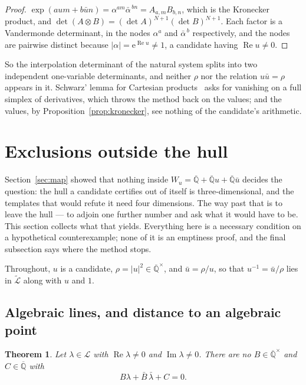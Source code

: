 \documentclass[11pt,a4paper]{article}
\theoremstyle{plain}
\newtheorem{theorem}{Theorem}[section]
\theoremstyle{definition}
\newcommand{\e}{\mathrm{e}}
\newcommand{\Alg}{\overline{\mathbb{Q}}}
\newcommand{\Logs}{\mathcal{L}}
\newcommand{\aLogs}{\widetilde{\mathcal{L}}}
\begin{document}
\begin{proof}
$\exp(aum+b\bar un)=\alpha^{am}\bar\alpha^{\,bn}=A_{a,m}B_{b,n}$, which is the Kronecker product,
and $\det(A\otimes B)=(\det A)^{N+1}(\det B)^{N+1}$. Each factor is a Vandermonde determinant, in
the nodes $\alpha^{a}$ and $\bar\alpha^{\,b}$ respectively, and the nodes are pairwise distinct
because $|\alpha|=\e^{\operatorname{Re}u}\neq1$, a candidate having $\operatorname{Re}u\neq0$.
\end{proof}

So the interpolation determinant of the natural system splits into two independent one-variable
determinants, and neither $\rho$ nor the relation $u\bar u=\rho$ appears in it. Schwarz' lemma for
Cartesian products~\cite[Proposition~4.7]{waldschmidt-book} asks for vanishing on a full simplex
of derivatives, which throws the method back on the values; and the values, by
Proposition~\ref{prop:kronecker}, see nothing of the candidate's arithmetic.

\section{Exclusions outside the hull}\label{sec:outside}

Section~\ref{sec:map} showed that nothing inside $W_{u}=\Alg+\Alg u+\Alg\bar u$ decides the
question: the hull a candidate certifies out of itself is three-dimensional, and the templates
that would refute it need four dimensions. The way past that is to leave the hull --- to adjoin
one further number and ask what it would have to be. This section collects what that yields.
Everything here is a necessary condition on a hypothetical counterexample; none of it is an
emptiness proof, and the final subsection says where the method stops.

Throughout, $u$ is a candidate, $\rho=|u|^{2}\in\Alg^{\times}$, and $\bar u=\rho/u$, so that
$u^{-1}=\bar u/\rho$ lies in $\aLogs$ along with $u$ and $1$.

\subsection*{Algebraic lines, and distance to an algebraic point}

\begin{theorem}\label{thm:line}
Let $\lambda\in\Logs$ with $\operatorname{Re}\lambda\neq0$ and $\operatorname{Im}\lambda\neq0$.
There are no $B\in\Alg^{\times}$ and $C\in\Alg$ with
\[
  B\lambda+\bar B\,\bar\lambda+C=0 .
\]
\end{theorem}
\end{document}
